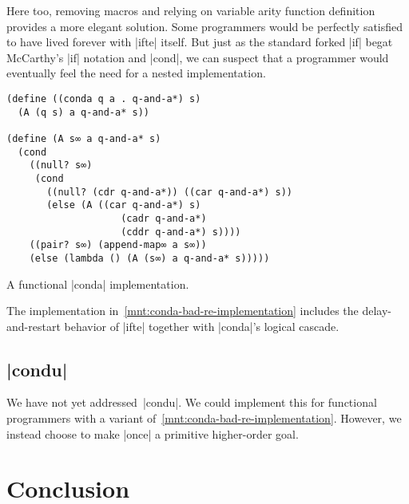 \documentclass[sigplan,screen,draft,anonymous,review,natbib=false]{acmart}
\begin{document}
Here too, removing macros and relying on variable arity function
definition provides a more elegant solution. Some programmers would be
perfectly satisfied to have lived forever with \rackinline|ifte|
itself. But just as the standard forked \rackinline|if| begat
McCarthy's \rackinline|if| notation and \rackinline|cond|, we can
suspect that a programmer would eventually feel the need for a nested
implementation.

\begin{listing}
  \begin{verbatim}
(define ((conda q a . q-and-a*) s)
  (A (q s) a q-and-a* s))

(define (A s∞ a q-and-a* s)
  (cond
    ((null? s∞)
     (cond
       ((null? (cdr q-and-a*)) ((car q-and-a*) s))
       (else (A ((car q-and-a*) s)
                    (cadr q-and-a*)
                    (cddr q-and-a*) s))))
    ((pair? s∞) (append-map∞ a s∞))
    (else (lambda () (A (s∞) a q-and-a* s)))))
  \end{verbatim}
  \caption{A functional \rackinline|conda| implementation.}
  \label{mnt:conda-good-re-implementation}
\end{listing}

The implementation in~\cref{mnt:conda-bad-re-implementation} includes
the delay-and-restart behavior of \rackinline|ifte| together with
\rackinline|conda|'s logical cascade.

\subsection{\rackinline|condu|}

We have not yet addressed~\rackinline|condu|. We could implement this
for functional programmers with a variant
of~\cref{mnt:conda-bad-re-implementation}. However, we instead choose
to make \rackinline|once| a primitive higher-order goal.


\section{Conclusion}\label{sec:conclusion}
\end{document}
